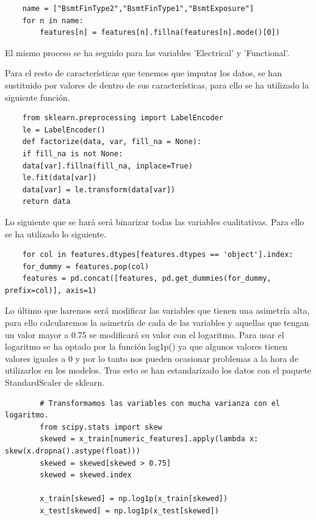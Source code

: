 	\vspace{0.06in}
	
	\begin{lstlisting}
	name = ["BsmtFinType2","BsmtFinType1","BsmtExposure"]
	for n in name:
		features[n] = features[n].fillna(features[n].mode()[0])
	\end{lstlisting}
	
	\vspace{0.06in}
	El mismo proceso se ha seguido para las variables 'Electrical' y  'Functional'.
	
	\vspace{0.06in}
	
	Para el resto de características que tenemos que imputar los datos, se han sustituido por valores de dentro de sus características, para ello se ha utilizado la siguiente función.
	
	\begin{lstlisting}
	from sklearn.preprocessing import LabelEncoder
	le = LabelEncoder()
	def factorize(data, var, fill_na = None):
	if fill_na is not None:
	data[var].fillna(fill_na, inplace=True)
	le.fit(data[var])
	data[var] = le.transform(data[var])
	return data
	\end{lstlisting}
	
	\vspace{0.06in}
	Lo siguiente que se hará será binarizar todas las variables cualitativas. Para ello se ha utilizado lo siguiente.
	
	\vspace{0.06in}
	
	\begin{lstlisting}
	for col in features.dtypes[features.dtypes == 'object'].index:
	for_dummy = features.pop(col)
	features = pd.concat([features, pd.get_dummies(for_dummy, prefix=col)], axis=1)
	\end{lstlisting}
	
	\vspace{0.06in}
	Lo último que haremos será modificar las variables que tienen una asimetría alta, para ello calcularemos la asimetría de cada de las variables y aquellas que tengan un valor mayor a 0.75 se modificará su valor con el logaritmo. Para usar el logaritmo se ha optado por la función log1p() ya que algunos valores tienen valores iguales a 0 y por lo tanto nos pueden ocasionar problemas a la hora de utilizarlos en los modelos. Tras esto se han estandarizado los datos con el paquete StandardScaler de sklearn.
	
	\vspace{0.06in}
	\begin{lstlisting}
		# Transformamos las variables con mucha varianza con el logaritmo.
		from scipy.stats import skew
		skewed = x_train[numeric_features].apply(lambda x: skew(x.dropna().astype(float)))
		skewed = skewed[skewed > 0.75]
		skewed = skewed.index
		
		x_train[skewed] = np.log1p(x_train[skewed])
		x_test[skewed] = np.log1p(x_test[skewed])
	\end{lstlisting}
	
